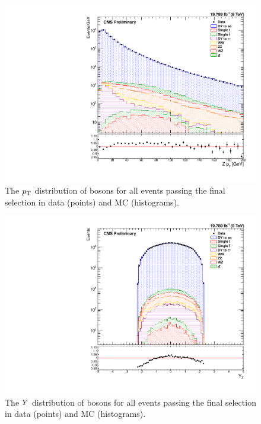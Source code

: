 \begin{figure}[!htbp]
    \centering
    \includegraphics[width=\textwidth]{figures/z_pt.pdf}
    \caption[
        The $\pt$ distribution of \Z bosons in data and MC.
    ]{
        The $\pt$ distribution of \Z bosons for all events passing the final
        selection in data (points) and MC (histograms).
    }
    \label{fig:z_pt}
\end{figure}

\begin{figure}[!htbp]
    \centering
    \includegraphics[width=\textwidth]{figures/z_rapidity.pdf}
    \caption[
        The $\rapidity$ distribution of \Z bosons in data and MC.
    ]{
        The $\rapidity$ distribution of \Z bosons for all events passing the
        final selection in data (points) and MC (histograms).
    }
    \label{fig:z_rapidity}
\end{figure}

